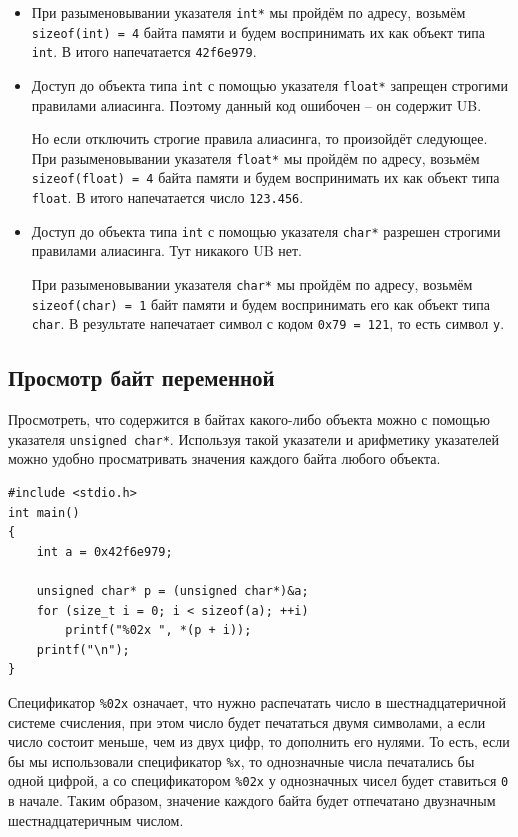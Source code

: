 \documentclass[10pt]{article}
\begin{document}
\begin{itemize}
\item При разыменовывании указателя \texttt{int*} мы пройдём по адресу, возьмём \texttt{sizeof(int) = 4} байта памяти и будем воспринимать их как объект типа \texttt{int}. В итого напечатается \texttt{42f6e979}.

\item Доступ до объекта типа \texttt{int} с помощью указателя \texttt{float*} запрещен строгими правилами алиасинга. Поэтому данный код ошибочен -- он содержит UB. 

Но если отключить строгие правила алиасинга, то произойдёт следующее. При разыменовывании указателя \texttt{float*} мы пройдём по адресу, возьмём \texttt{sizeof(float) = 4} байта памяти и будем воспринимать их как объект типа \texttt{float}. В итого напечатается число \texttt{123.456}. 

\item Доступ до объекта типа \texttt{int} с помощью указателя \texttt{char*} разрешен строгими правилами алиасинга. Тут никакого UB нет.

При разыменовывании указателя \texttt{char*} мы пройдём по адресу, возьмём \texttt{sizeof(char) = 1} байт памяти и будем воспринимать его как объект типа \texttt{char}. В результате напечатает символ с кодом \texttt{0x79 = 121}, то есть символ \texttt{y}.
\end{itemize}





\subsection*{Просмотр байт переменной}
Просмотреть, что содержится в байтах какого-либо объекта можно с помощью указателя \texttt{unsigned char*}. Используя такой указатели и арифметику указателей можно удобно просматривать значения каждого байта любого объекта.

\begin{lstlisting} 
#include <stdio.h>
int main() 
{
    int a = 0x42f6e979;
    
    unsigned char* p = (unsigned char*)&a;
    for (size_t i = 0; i < sizeof(a); ++i)
        printf("%02x ", *(p + i));
    printf("\n");
}
\end{lstlisting}
Спецификатор \texttt{\%02x} означает, что нужно распечатать число в шестнадцатеричной системе счисления, при этом число будет печататься двумя символами, а если число состоит меньше, чем из двух цифр, то дополнить его нулями. То есть, если бы мы использовали спецификатор \texttt{\%x}, то однозначные числа печатались бы одной цифрой, а со спецификатором \texttt{\%02x} у однозначных чисел будет ставиться \texttt{0} в начале. Таким образом, значение каждого байта будет отпечатано двузначным шестнадцатеричным числом.
\end{document}
